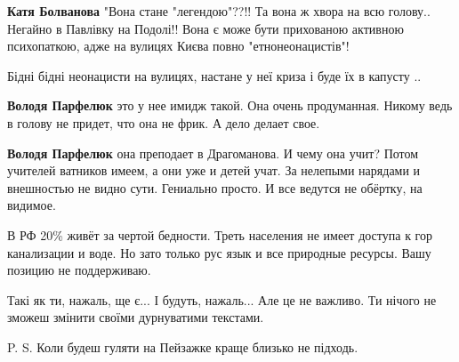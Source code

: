 \begin{itemize}
\begin{itemize}

\textbf{Катя Болванова} "Вона стане "легендою"??!! Та вона ж хвора на всю голову.. Негайно в Павлівку на Подолі!! Вона є може бути прихованою активною психопаткою, адже на вулицях Києва повно "етнонеонацистів"!


Бідні бідні неонацисти на вулицях, настане у неї криза і буде їх в капусту ..


\textbf{Володя Парфелюк} это у нее имидж такой. Она очень продуманная. Никому ведь в голову не придет, что она не фрик. А дело делает свое.


\textbf{Володя Парфелюк} она преподает в Драгоманова. И чему она учит? Потом учителей ватников имеем, а они уже и детей учат. За нелепыми нарядами и внешностью не видно сути. Гениально просто. И все ведутся не обёртку, на видимое.

\end{itemize}


В РФ 20\% живёт за чертой бедности. Треть населения не имеет доступа к гор канализации и воде. Но зато только рус язык и все природные ресурсы. Вашу позицию не поддерживаю.



Такі як ти, нажаль, ще є... І будуть, нажаль... Але це не важливо. Ти нічого не
зможеш змінити своїми дурнуватими текстами.

P. S. Коли будеш гуляти на Пейзажке краще близько не підходь.





\end{itemize}
